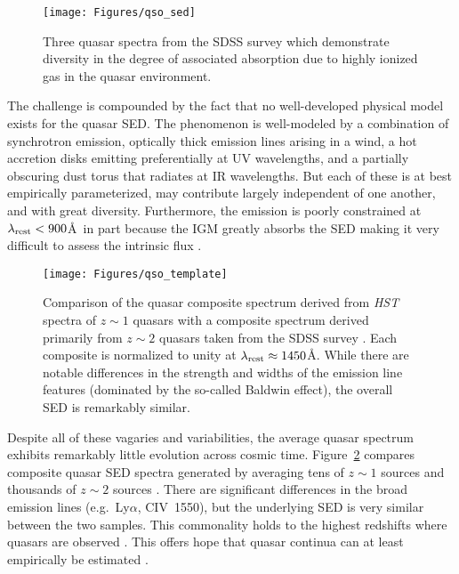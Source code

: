 \documentclass[graybox]{svmult}
\def\lya{Ly$\alpha$}
\begin{document}
%
\begin{figure}[b]
\sidecaption
\texttt{[image: Figures/qso\_sed]}
%
%
\caption{Three quasar spectra from the SDSS survey
which demonstrate diversity in the degree of associated
absorption due to highly ionized gas in the quasar
environment.
}
\label{fig:qso_SED}       %
\end{figure}

The challenge is compounded by the fact that no well-developed physical
model exists for the quasar SED.  The phenomenon is well-modeled
by a combination of synchrotron emission, optically thick
emission lines arising in a wind, a hot accretion disks 
emitting preferentially at UV wavelengths, and a partially
obscuring dust torus that radiates at IR wavelengths.
But each of these is at best empirically parameterized, may
contribute largely independent of one another, and 
with great diversity.  Furthermore, the emission is
poorly constrained at $\lambda_{\rm rest} < 900$\AA\
in part because the IGM greatly absorbs the SED
making it very difficult to assess the intrinsic flux 
\cite[see][]{lusso+16}.

%
\begin{figure}[b]
\sidecaption
\texttt{[image: Figures/qso\_template]}
%
%
\caption{Comparison of the quasar composite spectrum derived
from {\it HST} spectra of $z \sim 1$ quasars 
\cite{telfer2001} with a composite spectrum derived
primarily from $z \sim 2$ quasars taken from the SDSS survey
\cite{vandden0X}.  Each composite is normalized to unity
at $\lambda_{\rm rest} \approx 1450$\AA.
While there are notable differences in the
strength and widths of the emission line features (dominated
by the so-called Baldwin effect), the overall SED is remarkably
similar.  
}
\label{fig:qso_template}       %
\end{figure}



Despite all of these vagaries and variabilities, the average
quasar spectrum exhibits remarkably little evolution across
cosmic time.  Figure~\ref{fig:qso_template}
compares composite quasar SED spectra generated by
averaging tens of $z \sim 1$ sources \cite{telfer01}
and thousands of $z \sim 2$ sources \cite{vanden01}.
There are significant differences in the broad emission
lines (e.g.\ \lya, CIV~1550), but the underlying
SED is very similar between the two samples.  This commonality
holds to the highest redshifts where quasars are
observed \cite[Figure~\ref{fig:becker13_fig2}][]{becker+13}.
This offers hope that quasar continua can at least
empirically be estimated \cite{new_paper_by_AZ_guy}.
\end{document}
